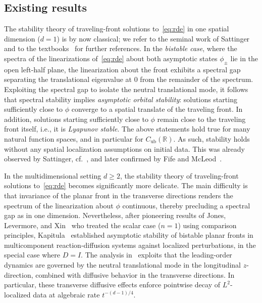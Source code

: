 \documentclass[12pt,oneside,a4paper,reqno]{amsart}
\numberwithin{equation}{section}
\theoremstyle{definition}
\theoremstyle{remark}
\newcommand{\bbR}{{\mathbb R}}
\newcommand{\Cub}{{C_{\mathrm{ub}}}}
\begin{document}
\subsection{Existing results}
The stability theory of traveling-front solutions to~\eqref{eq:rde} in one spatial dimension ($d=1$) is by now classical; we refer to the seminal work of Sattinger~\cite{Sattinger_stability_1976} and to the textbooks~\cite{Henry_geometric_1981,Kapitula_spectral_2013} for further references. 
In the \emph{bistable case}, where the spectra of the linearizations of~\eqref{eq:rde} about both asymptotic states $\phi_\pm$ lie in the open left-half plane, the linearization about the front exhibits a spectral gap separating the translational eigenvalue at $0$ from the remainder of the spectrum.
Exploiting the spectral gap to isolate the neutral translational mode, it follows that spectral stability implies \emph{asymptotic orbital stability}: solutions starting sufficiently close to $\phi$ converge to a spatial translate of the traveling front. 
In addition, solutions starting sufficiently close to $\phi$ remain close to the traveling front itself, i.e., it is \emph{Lyapunov stable}.
The above statements hold true for many natural function spaces, and in particular for $\Cub(\bbR)$.
As such, stability holds without any spatial localization assumptions on initial data.
This was already observed by Sattinger, cf.~\cite[\S\,8]{Sattinger_stability_1976}, and later confirmed by Fife and McLeod~\cite{Fife_approach_1977}.

In the multidimensional setting $d \geq 2$, the stability theory of traveling-front solutions to~\eqref{eq:rde} becomes significantly more delicate. The main difficulty is that invariance of the planar front in the transverse directions renders the spectrum of the linearization about $\phi$ continuous, thereby precluding a spectral gap as in one dimension. Nevertheless, after pioneering results of Jones, Levermore, and Xin~\cite{jones_asymptotic_1983,levermore_multidimensional_1992, xin_multidimensional_1992} who treated the scalar case ($n = 1$)
using comparison principles, Kapitula~\cite{kapitula_multidimensional_1997} established asymptotic stability of bistable planar fronts in multicomponent reaction-diffusion systems against localized perturbations, in the special case where $D = I$.
The analysis in~\cite{kapitula_multidimensional_1997} exploits that the leading-order dynamics are governed by the neutral translational mode in the longitudinal $z$-direction, combined with diffusive behavior in the transverse directions. In particular, these transverse diffusive effects enforce pointwise decay of $L^2$-localized data at algebraic rate $t^{-(d-1)/4}$.
\end{document}
